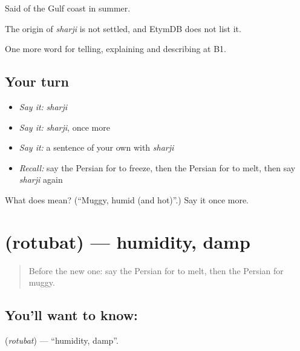 Said of the Gulf coast in summer.

\begin{cousinweb}
The origin of \emph{sharji} is not settled, and EtymDB does not list it.
\end{cousinweb}

\begin{grammarlens}[title={What you've built}]
One more word for telling, explaining and describing at B1.
\end{grammarlens}

\subsection*{Your turn}
\begin{itemize}
\raggedright
  \item \emph{Say it:} \emph{sharji}
  \item \emph{Say it:} \emph{sharji}, once more
  \item \emph{Say it:} a sentence of your own with \emph{sharji}
  \item \emph{Recall:} say the Persian for to freeze, then the Persian for to melt, then say \emph{sharji} again
\end{itemize}

\begin{tcolorbox}[breakable,colback=teal!4,colframe=teal!35!black,title={Before you move on}]
What does  mean? (\textquotedblleft{}Muggy, humid (and hot)\textquotedblright{}.) Say it once more.
\end{tcolorbox}
\section[\texorpdfstring{\fa{رطوبت} (rotubat)}{رطوبت (rotubat)}]{ (rotubat) — humidity, damp}

\label{lesson:FA-C477-rotubat}



\begin{quote}
Before the new one: say the Persian for to melt, then the Persian for muggy.
\end{quote}

\subsection*{You'll want to know: }
\textbf{} (\emph{rotubat}) — \textquotedblleft{}humidity, damp\textquotedblright{}.

